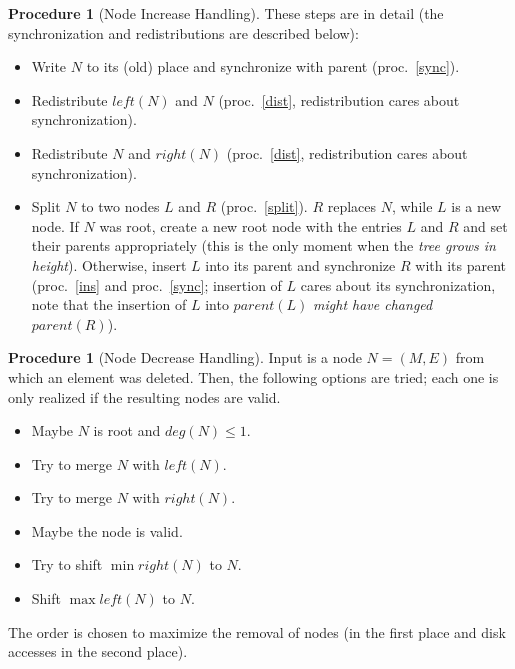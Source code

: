 \documentclass[a4paper, 8pt, twoclumn]{scrartcl}
\theoremstyle{plain}
\theoremstyle{definition}
\newtheorem{proc}[thm]{Procedure}
\theoremstyle{remark}
\begin{document}
\begin{multicols}{2}
\begin{proc}[Node Increase Handling]
These steps are in detail (the synchronization and redistributions are 
described below):
\begin{itemize}
\item[ad 1:] Write $N$ to its (old) place and synchronize with parent
	(proc.~\ref{sync}).
\item[ad 2:] Redistribute $left(N)$ and $N$ (proc.~\ref{dist},
	redistribution cares about synchronization).
\item[ad 3:] Redistribute $N$ and $right(N)$ (proc.~\ref{dist},
	redistribution cares about synchronization).
\item[ad 4:] Split $N$ to two nodes $L$ and $R$ (proc.~\ref{split}).
	$R$ replaces $N$, while $L$ is a new node.
	If $N$ was root, create a new root node with the entries $L$ and $R$ and
	set their parents appropriately (this is the only moment when the
	{\em tree grows in height}).
	Otherwise, insert $L$ into its parent and synchronize $R$ with its parent
	(proc.~\ref{ins} and proc.~\ref{sync}; insertion of $L$ cares about its
	synchronization, note that the insertion of $L$ into $parent(L)$
	{\em might have changed} $parent(R)$).
\end{itemize}
\end{proc}


\begin{proc}[Node Decrease Handling] \label{dec}
Input is a node \mbox{$N = (M, E)$} from which an element was deleted.
Then, the following options are tried; each one is only realized if the
resulting nodes are valid.
\begin{itemize}
\item[1:] Maybe $N$ is root and \mbox{$deg(N) \leq 1$}.
\item[2:] Try to merge $N$ with $left(N)$.
\item[3:] Try to merge $N$ with $right(N)$.
\item[4:] Maybe the node is valid.
\item[5:] Try to shift \mbox{$\min right(N)$} to $N$.
\item[6:] Shift \mbox{$\max left(N)$} to $N$.
\end{itemize}
The order is chosen to maximize the removal of nodes (in the first place and
disk accesses in the second place).


\end{proc}
\end{multicols}
\end{document}
